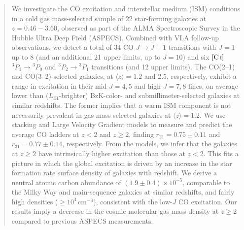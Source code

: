 \documentclass[twocolumn]{aastex62}
\newcommand{\LIR}{\ensuremath{L_{\mathrm{IR}}}}
\newcommand{\avg}[1]{\ensuremath{\langle #1 \rangle}}
\newcommand{\CI}{\ensuremath{\mathrm{[C\, \textsc{i}]}}}
\newcommand{\avgCIabundCO}{\ensuremath{(1.9 \pm 0.4) \times 10^{-5}}}
\newcommand{\rTwoOneLVGzLoTwo}{\ensuremath{0.75 \pm 0.11}}
\newcommand{\rThreeOnestack}{\ensuremath{0.77 \pm 0.14}}
\begin{document}
\begin{abstract}
  We investigate the CO excitation and interstellar medium (ISM) conditions in
  a cold gas mass-selected sample of 22 star-forming galaxies at $z=0.46-3.60$,
  observed as part of the ALMA Spectroscopic Survey in the Hubble Ultra Deep
  Field (ASPECS).  Combined with VLA follow-up observations, we detect a total
  of 34 CO $J \rightarrow J-1$ transitions with $J=1$ up to 8 (and an
  additional 21 upper limits, up to $J=10$) and six $\CI$
  ${^{3}P_{1}} \rightarrow {^{3}P_{0}}$ and
  ${^{3}P_{2}} \rightarrow {^{3}P_{1}}$ transitions (and 12 upper limits).  The
  CO(2--1) and CO(3--2)-selected galaxies, at $\avg{z}=1.2$ and 2.5,
  respectively, exhibit a range in excitation in their mid-$J=4,5$ and
  high-$J=7,8$ lines, on average lower than (\LIR-brighter) BzK-color- and
  submillimeter-selected galaxies at similar redshifts.  The former implies
  that a warm ISM component is not necessarily prevalent in gas mass-selected
  galaxies at $\avg{z}=1.2$.  We use stacking and Large Velocity Gradient
  models to measure and predict the average CO ladders at $z<2$ and $z\ge2$,
  finding $r_{21} = \rTwoOneLVGzLoTwo$ and $r_{31} = \rThreeOnestack$,
  respectively.  From the models, we infer that the galaxies at $z\ge2$ have
  intrinsically higher excitation than those at $z<2$.  This fits a picture in
  which the global excitation is driven by an increase in the star formation
  rate surface density of galaxies with redshift.  We derive a neutral atomic
  carbon abundance of \avgCIabundCO, comparable to the Milky Way and
  main-sequence galaxies at similar redshifts, and fairly high densities
  ($\ge 10^{4}$\,cm$^{-3}$), consistent with the low-$J$ CO excitation.  Our
  results imply a decrease in the cosmic molecular gas mass density at $z\ge2$
  compared to previous ASPECS measurements.
\end{abstract}
\end{document}
